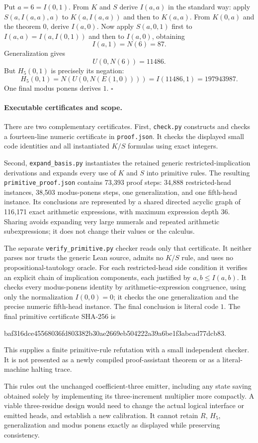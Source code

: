 Put $a=6=I(0,1)$.  From $K$ and $S$ derive $I(a,a)$ in the standard way:
apply $S(a,I(a,a),a)$ to $K(a,I(a,a))$ and then to $K(a,a)$.
From $K(0,a)$ and the theorem $0$, derive $I(a,0)$.
Now apply $S(a,0,1)$ first to $I(a,a)=I(a,I(0,1))$ and then to
$I(a,0)$, obtaining
\[
                   I(a,1)=N(6)=87.
\]
Generalization gives
\[
                     U(0,N(6))=11486.
\]
But $H_5(0,1)$ is precisely its negation:
\[
 H_5(0,1)=N(U(0,N(E(1,0))))
        =I(11486,1)=197943987.
\]
One final modus ponens derives $1$.
\hfill$\square$

\paragraph{Executable certificates and scope.}
There are two complementary certificates.  First, \texttt{check.py}
constructs and checks a fourteen-line numeric certificate in
\texttt{proof.json}.  It checks the displayed small code identities and all
instantiated $K/S$ formulas using exact integers.

Second, \texttt{expand\_basis.py} instantiates the retained generic
restricted-implication derivations and expands every use of $K$ and $S$
into primitive rules.  The resulting \texttt{primitive\_proof.json} contains
73,393 proof steps: 34,888 restricted-head instances, 38,503 modus-ponens
steps, one generalization, and one fifth-head instance.  Its conclusions
are represented by a shared directed acyclic graph of 116,171 exact
arithmetic expressions, with maximum expression depth 36.  Sharing avoids
expanding very large numerals and repeated arithmetic subexpressions;
it does not change their values or the calculus.

The separate \texttt{verify\_primitive.py} checker reads only that
certificate.  It neither parses nor trusts the generic Lean source, admits
no $K/S$ rule, and uses no propositional-tautology oracle.  For each
restricted-head side condition it verifies an explicit chain of implication
components, each justified by $a,b\le I(a,b)$.  It checks every
modus-ponens identity by arithmetic-expression congruence, using only the
normalization $I(0,0)=0$; it checks the one generalization and the precise
numeric fifth-head instance.  The final conclusion is literal code $1$.
The final primitive certificate SHA-256 is
\begin{center}\scriptsize\ttfamily
baf316dce45568036fd803382b30ae2669eb504222a39a6be1f3abcad77dcb83.
\end{center}
This supplies a finite primitive-rule refutation with a small independent
checker.  It is not presented as a newly compiled proof-assistant theorem
or as a literal-machine halting trace.

This rules out the unchanged coefficient-three emitter, including any
state saving obtained solely by implementing its three-increment
multiplier more compactly.  A viable three-residue design would need to
change the actual logical interface or emitted heads, and establish a new
calibration.  It cannot retain $R$, $H_5$, generalization and modus ponens
exactly as displayed while preserving consistency.
